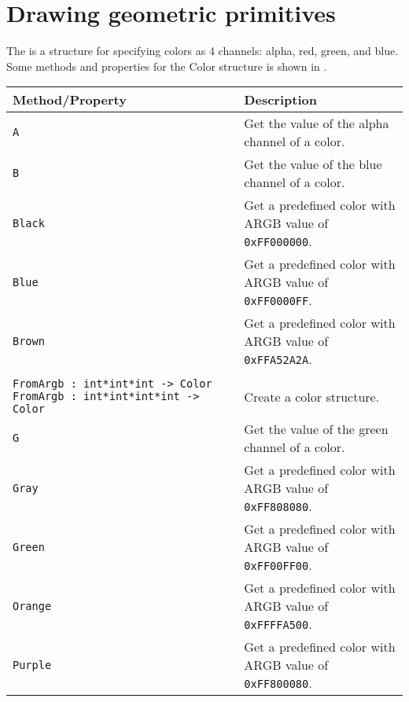 \section{Drawing geometric primitives}
The  is a structure for specifying colors as 4 channels: alpha, red, green, and blue. Some methods and properties for the Color structure is shown in .
\begin{table}
  \begin{center}
    \begin{tabularx}{\linewidth}{|l|X|}
      \hline
      \rowcolor{headerRowColor}  Method/Property & Description\\
      \hline
      \lstinline{A}
      &Get the value of the alpha channel of a color.\\
      \hline
      \lstinline{B}
      &Get the value of the blue channel of a color.\\
      \hline
      \lstinline{Black}
      &Get a predefined color with ARGB value of \lstinline{0xFF000000}.\\
      \hline
      \lstinline{Blue}
      &Get a predefined color with ARGB value of \lstinline{0xFF0000FF}.\\
      \hline
      \lstinline{Brown}
      &Get a predefined color with ARGB value of \lstinline{0xFFA52A2A}.\\
      \hline
      \begin{minipage}{0.45\linewidth}
        \lstinline{FromArgb : int -> Color}\\
        \lstinline{FromArgb : int*int*int -> Color}
        \lstinline{FromArgb : int*int*int*int -> Color}
      \end{minipage}
      &Create a color structure.\\
      \hline
      \lstinline{G}
      &Get the value of the green channel of a color.\\
      \hline
      \lstinline{Gray}
      &Get a predefined color with ARGB value of \lstinline{0xFF808080}.\\
      \hline
      \lstinline{Green}
      &Get a predefined color with ARGB value of \lstinline{0xFF00FF00}.\\
      \hline
      \lstinline{Orange}
      &Get a predefined color with ARGB value of \lstinline{0xFFFFA500}.\\
      \hline
      \lstinline{Purple}
      &Get a predefined color with ARGB value of \lstinline{0xFF800080}.\\

\end{tabularx}
\end{center}
\end{table}
